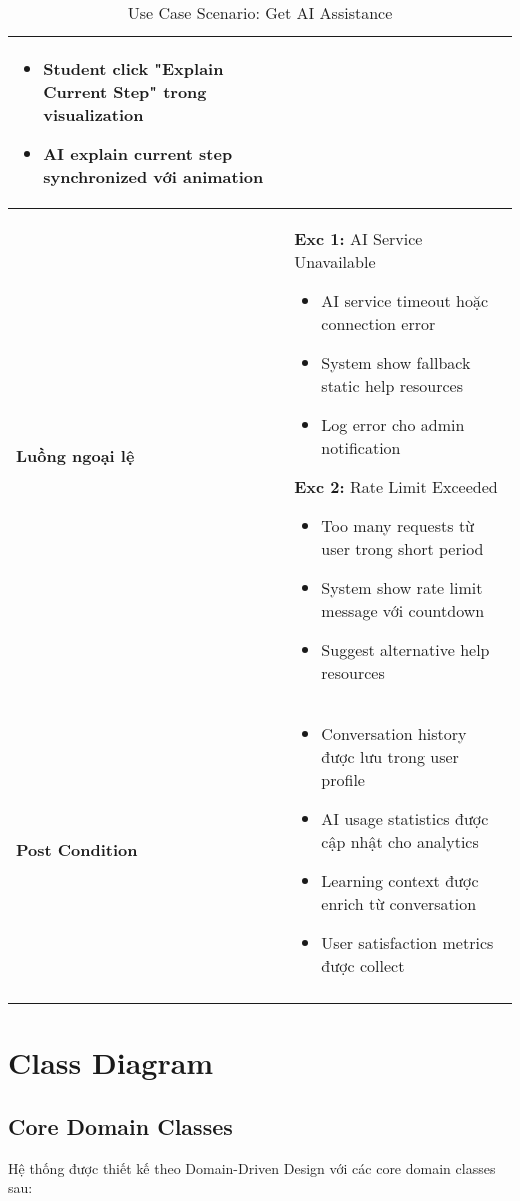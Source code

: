 \begin{longtable}{| p{3cm} | p{10cm} |}
\begin{itemize}
    \item Student click "Explain Current Step" trong visualization
    \item AI explain current step synchronized với animation
\end{itemize} \\ \hline
\textbf{Luồng ngoại lệ} & 
\textbf{Exc 1:} AI Service Unavailable
\begin{itemize}
    \item AI service timeout hoặc connection error
    \item System show fallback static help resources
    \item Log error cho admin notification
\end{itemize}
\textbf{Exc 2:} Rate Limit Exceeded
\begin{itemize}
    \item Too many requests từ user trong short period
    \item System show rate limit message với countdown
    \item Suggest alternative help resources
\end{itemize} \\ \hline
\textbf{Post Condition} & 
\begin{itemize}
    \item Conversation history được lưu trong user profile
    \item AI usage statistics được cập nhật cho analytics
    \item Learning context được enrich từ conversation
    \item User satisfaction metrics được collect
\end{itemize} \\ \hline
\caption{Use Case Scenario: Get AI Assistance}
\label{tab:uc-ai-assistance} \\
\end{longtable}

\section{Class Diagram}
\label{sec:class-diagram}

\subsection{Core Domain Classes}
\label{subsec:core-classes}

Hệ thống được thiết kế theo Domain-Driven Design với các core domain classes sau:

